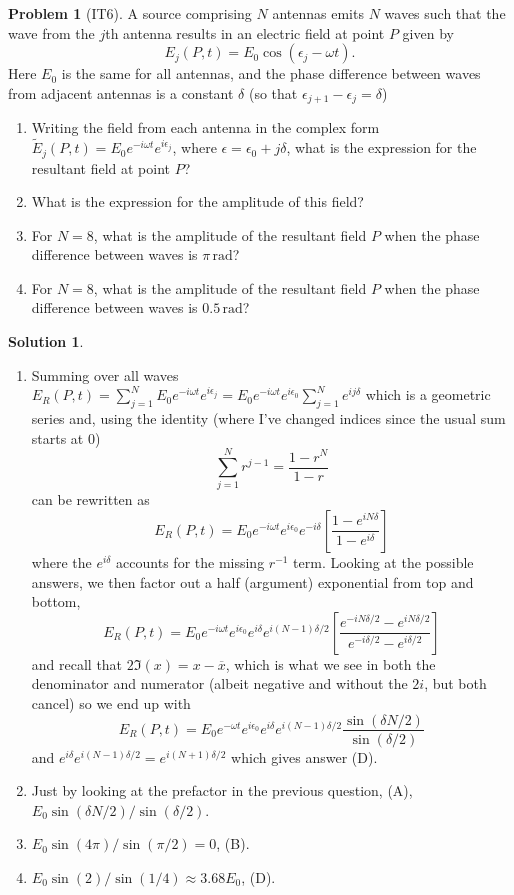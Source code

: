 \documentclass[10pt]{article}
\theoremstyle{definition}
\newtheorem{problem}{Problem}
\newtheorem{soln}{Solution}
\newcommand{\ti}[1]{\widetilde{#1}}
\begin{document}
\begin{problem}[IT6] A source comprising $N$ antennas emits $N$ waves such that the wave from the $j$th antenna results
in an electric field at point $P$ given by
$$E_j(P,t)=E_0\cos(\epsilon_j-\omega t).$$
Here $E_0$ is the same for all antennas, and the phase difference between waves from adjacent antennas is a constant $\delta$ (so that $\epsilon_{j+1}-\epsilon_j=\delta$)
\begin{enumerate}[label=(\roman*)]
  \item Writing the field from each antenna in the complex form $\ti{E}_j(P,t)=E_0e^{-i\omega t}e^{i\epsilon_j}$, where $\epsilon=\epsilon_0+j\delta$,
        what is the expression for the resultant field at point $P$?
  \item What is the expression for the amplitude of this field?
  \item For $N=8$, what is the amplitude of the resultant field $P$ when the phase difference between waves is $\pi\,\unit{\radian}$?
  \item For $N=8$, what is the amplitude of the resultant field $P$ when the phase difference between waves is $0.5\,\unit{\radian}$?
\end{enumerate}
\end{problem}
\begin{soln}~\begin{enumerate}[label=(\roman*)]
    \item Summing over all waves $E_R(P,t)=\sum_{j=1}^{N}E_0e^{-i\omega t}e^{i\epsilon_j}=E_0e^{-i\omega t}e^{i\epsilon_0}\sum_{j=1}^{N}e^{ij\delta}$
          which is a geometric series and, using the identity (where I've changed indices since the usual sum starts at 0)
          $$\sum_{j=1}^{N}r^{j-1}=\frac{1-r^N}{1-r}$$
          can be rewritten as
          $$E_R(P,t)=E_0e^{-i\omega t}e^{i\epsilon_0}e^{-i\delta}\left[\frac{1-e^{iN\delta}}{1-e^{i\delta}}\right]$$
          where the $e^{i\delta}$ accounts for the missing $r^{-1}$ term.
          Looking at the possible answers, we then factor out a half (argument) exponential from top and bottom,
          $$E_R(P,t)=E_0e^{-i\omega t}e^{i\epsilon_0}e^{i\delta}e^{i(N-1)\delta/2}\left[\frac{e^{-iN\delta/2}-e^{iN\delta/2}}{e^{-i\delta/2}-e^{i\delta/2}}\right]$$
          and recall that $2\Im(x)=x-\overline{x}$, which is what we see in both the denominator and numerator (albeit negative and without the $2i$, but both cancel)
          so we end up with
          $$E_R(P,t)=E_0e^{-\omega t}e^{i\epsilon_0}
            e^{i\delta}e^{i(N-1)\delta/2}\frac{\sin(\delta N/2)}{\sin(\delta/2)}
          $$
          and $e^{i\delta}e^{i(N-1)\delta/2}=e^{i(N+1)\delta/2}$ which gives answer (D).
    \item Just by looking at the prefactor in the previous question, (A), $E_0\sin(\delta N/2)/\sin(\delta/2)$.
    \item $E_0\sin(4\pi)/\sin(\pi/2)=0$, (B).
    \item $E_0\sin(2)/\sin(1/4)\approx 3.68E_0$, (D).
  \end{enumerate}
\end{soln}
\end{document}
